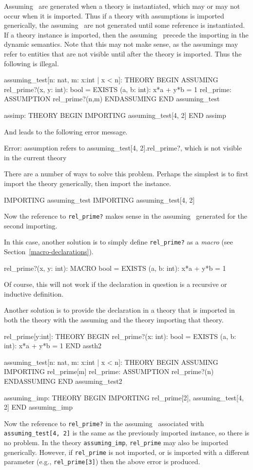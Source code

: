 Assuming \tccs\ are generated when a theory is instantiated, which may or
may not occur when it is imported.  Thus if a theory with assumptions is
imported generically, the assuming \tccs\ are not generated until some
reference is instantiated.  If a theory instance is imported, then the
assuming \tccs\ precede the importing in the dynamic semantics.  Note that
this may not make sense, as the assumings may refer to entities that are
not visible until after the theory is imported.  Thus the following is
illegal.
\begin{pvsex}
  assuming_test[n: nat, m: {x:int | x < n}]: THEORY
  BEGIN
   ASSUMING
    rel_prime?(x, y: int): bool = EXISTS (a, b: int): x*a + y*b = 1
    rel_prime: ASSUMPTION rel_prime?(n,m)
   ENDASSUMING
  END assuming_test

  assimp: THEORY
  BEGIN
   IMPORTING assuming_test[4, 2]
  END assimp
\end{pvsex}
And leads to the following error message.
\begin{pvsex}
  Error: assumption refers to 
    assuming_test[4, 2].rel_prime?,
  which is not visible in the current theory
\end{pvsex}
There are a number of ways to solve this problem.  Perhaps the simplest is
to first import the theory generically, then import the instance.
\begin{pvsex}
   IMPORTING assuming_test
   IMPORTING assuming_test[4, 2]
\end{pvsex}
Now the reference to \texttt{rel\_prime?} makes sense in the assuming
\tcc\ generated for the second importing.

In this case, another solution is to simply define \texttt{rel\_prime?} as
a \emph{macro} (see Section~\ref{macro-declarations}).
\begin{pvsex}
  rel_prime?(x, y: int): MACRO bool = EXISTS (a, b: int): x*a + y*b = 1
\end{pvsex}
Of course, this will not work if the declaration in question is a
recursive or inductive definition.

Another solution is to provide the declaration in a theory that is
imported in both the theory with the assuming and the theory importing
that theory.
\begin{pvsex}
  rel_prime[y:int]: THEORY
  BEGIN
   rel_prime?(x: int): bool = EXISTS (a, b: int): x*a + y*b = 1
  END assth2

  assuming_test[n: nat, m: {x:int | x < n}]: THEORY
  BEGIN
   ASSUMING
    IMPORTING rel_prime[m]
    rel_prime: ASSUMPTION rel_prime?(n)
   ENDASSUMING
  END assuming_test2

  assuming_imp: THEORY
  BEGIN
   IMPORTING rel_prime[2], assuming_test[4, 2]
  END assuming_imp
\end{pvsex}
Now the reference to \texttt{rel\_prime?} in the assuming \tcc\ associated
with \texttt{assuming\_test[4, 2]} is the same as the previously imported
instance, so there is no problem.  In the theory \texttt{assuming\_imp},
\texttt{rel\_prime} may also be imported generically.  However, if
\texttt{rel\_prime} is not imported, or is imported with a different
parameter (e.g., \texttt{rel\_prime[3]}) then the above error is produced.


